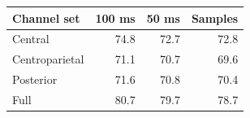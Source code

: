 \begin{tabular}{@{}lrrr@{}}
\toprule
Channel set & 100 ms & 50 ms & Samples \\
\midrule
Central & 74.8 & 72.7 & 72.8 \\
Centroparietal & 71.1 & 70.7 & 69.6 \\
Posterior & 71.6 & 70.8 & 70.4 \\
Full & 80.7 & 79.7 & 78.7 \\
\bottomrule
\end{tabular}
